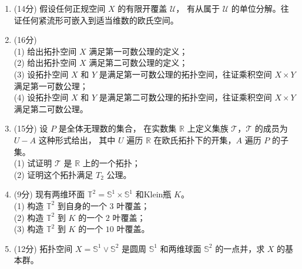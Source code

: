 \begin{enumerate}
\item[三、](14分) 假设任何正规空间 $X$ 的有限开覆盖 $\mathcal{U}$，
有从属于 $\mathcal{U}$ 的单位分解。往证任何紧流形可嵌入到适当维数的欧氏空间。

\item[四、](16分) \\
(1) 给出拓扑空间 $X$ 满足第一可数公理的定义；\\
(2) 给出拓扑空间 $X$ 满足第二可数公理的定义；\\
(3) 设拓扑空间 $X$ 和 $Y$ 是满足第一可数公理的拓扑空间，往证乘积空间 $X \times Y$ 满足第一可数公理；\\
(4) 设拓扑空间 $X$ 和 $Y$ 是满足第二可数公理的拓扑空间，往证乘积空间 $X \times Y$ 满足第二可数公理。

\item[五、](15分) 设 $P$ 是全体无理数的集合，
在实数集 $\mathbb{R}$ 上定义集族 $\mathcal{T}$，$\mathcal{T}$ 的成员为 $U-A$ 这种形式给出，
其中 $U$ 遍历 $\mathbb{R}$ 在欧氏拓扑下的开集，$A$ 遍历 $P$ 的子集。\\
(1) 试证明 $\mathcal{T}$ 是 $\mathbb{R}$ 上的一个拓扑；\\
(2) 证明这个拓扑满足 $T_2$ 公理。

\item[六、](9分) 
现有两维环面 $\mathbb{T}^2=\mathbb{S}^1 \times \mathbb{S}^1$ 和Klein瓶 $K$。\\
(1) 构造 $\mathbb{T}^2$ 到自身的一个 $3$ 叶覆盖；\\
(2) 构造 $\mathbb{T}^2$ 到 $K$ 的一个 $2$ 叶覆盖；\\
(3) 构造 $\mathbb{T}^2$ 到 $K$ 的一个 $10$ 叶覆盖。

\item[七、](12分) 拓扑空间 $X=\mathbb{S}^1 \vee \mathbb{S}^2$ 
是圆周 $\mathbb{S}^1$ 和两维球面 $\mathbb{S}^2$ 的一点并，求 $X$ 的基本群。
\end{enumerate}

